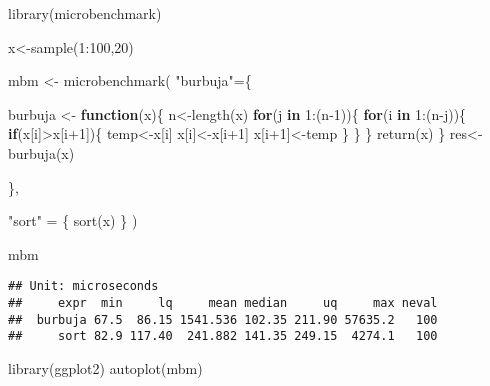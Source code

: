 \documentclass[]{elsarticle} %
\newenvironment{Shaded}{\begin{snugshade}}{\end{snugshade}}
\newcommand{\ControlFlowTok}[1]{\textcolor[rgb]{0.13,0.29,0.53}{\textbf{#1}}}
\newcommand{\DecValTok}[1]{\textcolor[rgb]{0.00,0.00,0.81}{#1}}
\newcommand{\FunctionTok}[1]{\textcolor[rgb]{0.00,0.00,0.00}{#1}}
\newcommand{\NormalTok}[1]{#1}
\newcommand{\OtherTok}[1]{\textcolor[rgb]{0.56,0.35,0.01}{#1}}
\newcommand{\SpecialCharTok}[1]{\textcolor[rgb]{0.00,0.00,0.00}{#1}}
\newcommand{\StringTok}[1]{\textcolor[rgb]{0.31,0.60,0.02}{#1}}
\begin{document}
\begin{Shaded}
\begin{Highlighting}[]
\FunctionTok{library}\NormalTok{(microbenchmark)}

\NormalTok{x}\OtherTok{\textless{}{-}}\FunctionTok{sample}\NormalTok{(}\DecValTok{1}\SpecialCharTok{:}\DecValTok{100}\NormalTok{,}\DecValTok{20}\NormalTok{)}


\NormalTok{mbm }\OtherTok{\textless{}{-}} \FunctionTok{microbenchmark}\NormalTok{( }
  \StringTok{"burbuja"}\OtherTok{=}\NormalTok{\{}

\NormalTok{burbuja }\OtherTok{\textless{}{-}} \ControlFlowTok{function}\NormalTok{(x)\{}
\NormalTok{n}\OtherTok{\textless{}{-}}\FunctionTok{length}\NormalTok{(x)}
\ControlFlowTok{for}\NormalTok{(j }\ControlFlowTok{in} \DecValTok{1}\SpecialCharTok{:}\NormalTok{(n}\DecValTok{{-}1}\NormalTok{))\{}
\ControlFlowTok{for}\NormalTok{(i }\ControlFlowTok{in} \DecValTok{1}\SpecialCharTok{:}\NormalTok{(n}\SpecialCharTok{{-}}\NormalTok{j))\{}
\ControlFlowTok{if}\NormalTok{(x[i]}\SpecialCharTok{\textgreater{}}\NormalTok{x[i}\SpecialCharTok{+}\DecValTok{1}\NormalTok{])\{}
\NormalTok{temp}\OtherTok{\textless{}{-}}\NormalTok{x[i]}
\NormalTok{x[i]}\OtherTok{\textless{}{-}}\NormalTok{x[i}\SpecialCharTok{+}\DecValTok{1}\NormalTok{]}
\NormalTok{x[i}\SpecialCharTok{+}\DecValTok{1}\NormalTok{]}\OtherTok{\textless{}{-}}\NormalTok{temp}
\NormalTok{\}}
\NormalTok{\}}
\NormalTok{\}}
\FunctionTok{return}\NormalTok{(x)}
\NormalTok{\}}
\NormalTok{res}\OtherTok{\textless{}{-}}\FunctionTok{burbuja}\NormalTok{(x)}

\NormalTok{  \},}

\StringTok{"sort"} \OtherTok{=}\NormalTok{ \{}
  \FunctionTok{sort}\NormalTok{(x)}
\NormalTok{\}}
\NormalTok{)}

\NormalTok{mbm}
\end{Highlighting}
\end{Shaded}

\begin{verbatim}
## Unit: microseconds
##     expr  min     lq     mean median     uq     max neval
##  burbuja 67.5  86.15 1541.536 102.35 211.90 57635.2   100
##     sort 82.9 117.40  241.882 141.35 249.15  4274.1   100
\end{verbatim}

\begin{Shaded}
\begin{Highlighting}[]
\FunctionTok{library}\NormalTok{(ggplot2)}
\FunctionTok{autoplot}\NormalTok{(mbm)}
\end{Highlighting}
\end{Shaded}
\end{document}
